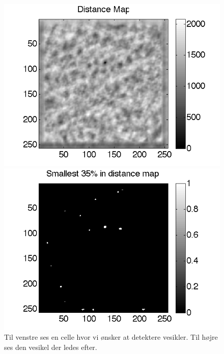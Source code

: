 \begin{figure}[H]
	\begin{minipage}[b]{0.5\linewidth}
		\centering
		\includegraphics[scale=0.5]{files/postmethod/img/conv_3.png}
	\end{minipage}
	\hspace{0.5cm}
	\begin{minipage}[b]{0.5\linewidth}
		\centering
		\includegraphics[scale=0.5]{files/postmethod/img/conv_4.png}
	\end{minipage}
	\caption{Til venstre ses en celle hvor vi ønsker at detektere vesikler. Til højre ses den vesikel der ledes efter.\label{fig:postmethod_conv_post}}
\end{figure}

